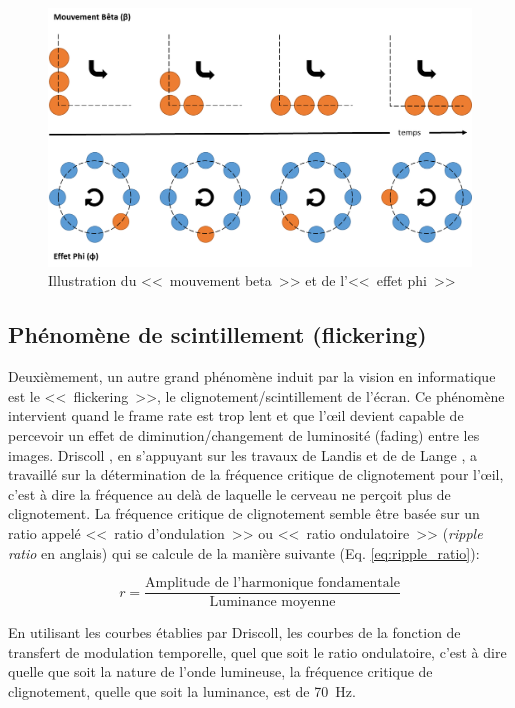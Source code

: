 	\begin{figure}
		\centering
		\includegraphics[scale=.65]{Figures/MouvementBetaEffetPhi}
		\caption{Illustration du <<~mouvement beta~>> et de l'<<~effet phi~>>}
		\label{fig:beta_phi}
	\end{figure}
	
	\subsection{Phénomène de scintillement (flickering)}
	\par Deuxièmement, un autre grand phénomène induit par la vision en informatique est le <<~flickering~>>, le clignotement/scintillement de l'écran. Ce phénomène intervient quand le frame rate est trop lent et que l'œil devient capable de percevoir un effet de diminution/changement de luminosité (fading) entre les images. Driscoll \citep{driscoll_eyes_1978}, en s'appuyant sur les travaux de Landis \citep{landis_determinants_1954} et de de Lange \citep{de_lange_dzn_research_1958,de_lange_dzn_research_1958-1}, a travaillé sur la détermination de la fréquence critique de clignotement pour l'œil, c'est à dire la fréquence au delà de laquelle le cerveau ne perçoit plus de clignotement. La fréquence critique de clignotement semble être basée sur un ratio appelé <<~ratio d'ondulation~>> ou <<~ratio ondulatoire~>> (\textit{ripple ratio} en anglais) qui se calcule de la manière suivante (Eq. \ref{eq:ripple_ratio}):
	
	\begin{equation}
	r = \frac{\textrm{Amplitude de l'harmonique fondamentale}}{\textrm{Luminance moyenne}}
	\label{eq:ripple_ratio}
	\end{equation}
	
	\par En utilisant les courbes établies par Driscoll, les courbes de la fonction de transfert de modulation temporelle, quel que soit le ratio ondulatoire, c'est à dire quelle que soit la nature de l'onde lumineuse, la fréquence critique de clignotement, quelle que soit la luminance, est de 70~Hz.
	
